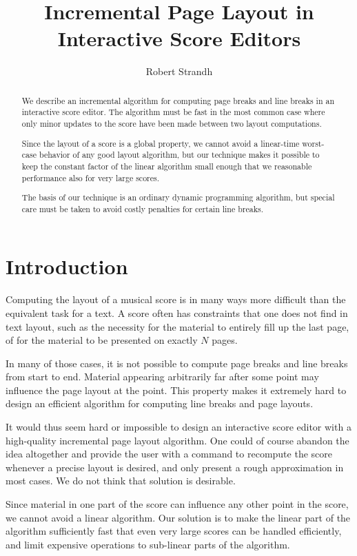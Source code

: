 \documentclass{article}
\title{Incremental Page Layout in Interactive Score Editors}
\author{Robert Strandh}
\begin{document}
\begin{abstract}

We describe an incremental algorithm for computing page breaks and
line breaks in an interactive score editor.  The algorithm must be
fast in the most common case where only minor updates to the score
have been made between two layout computations.

Since the layout of a score is a global property, we cannot avoid a
linear-time worst-case behavior of any good layout algorithm, but our
technique makes it possible to keep the constant factor of the linear
algorithm small enough that we reasonable performance also for very
large scores.

The basis of our technique is an ordinary dynamic programming
algorithm, but special care must be taken to avoid costly penalties
for certain line breaks.

\end{abstract}

\section{Introduction}

Computing the layout of a musical score is in many ways more difficult
than the equivalent task for a text.  A score often has constraints
that one does not find in text layout, such as the necessity for the
material to entirely fill up the last page, of for the material to be
presented on exactly $N$ pages. 

In many of those cases, it is not possible to compute page breaks and
line breaks from start to end.  Material appearing arbitrarily far
after some point may influence the page layout at the point.
This property makes it extremely hard to design an efficient algorithm
for computing line breaks and page layouts. 

It would thus seem hard or impossible to design an interactive score
editor with a high-quality incremental page layout algorithm.  One
could of course abandon the idea altogether and provide the user with
a command to recompute the score whenever a precise layout is desired,
and only present a rough approximation in most cases.  We do not think
that solution is desirable.  

Since material in one part of the score can influence any other point
in the score, we cannot avoid a linear algorithm.  Our solution is to
make the linear part of the algorithm sufficiently fast that even very
large scores can be handled efficiently, and limit expensive
operations to sub-linear parts of the algorithm.
\end{document}
